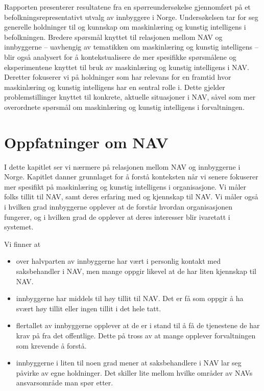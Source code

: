 \documentclass[
]{book}
\begin{document}
Rapporten presenterer resultatene fra en spørreundersøkelse gjennomført på et befolkningsrepresentativt utvalg av innbyggere i Norge.
Undersøkelsen tar for seg generelle holdninger til og kunnskap om maskinlæring og kunstig intelligens i befolkningen.
Bredere spørsmål knyttet til relasjonen mellom NAV og innbyggerne -- uavhengig av tematikken om maskinlæring og kunstig intelligens -- blir også analysert for å kontekstualisere de mer spesifikke spørsmålene og eksperimentene knyttet til bruk av maskinlæring og kunstig intelligens i NAV.
Deretter fokuserer vi på holdninger som har relevans for en framtid hvor maskinlæring og kunstig intelligens har en sentral rolle i.
Dette gjelder problemstillinger knyttet til konkrete, aktuelle situasjoner i NAV, såvel som mer overordnete spørsmål om maskinlæring og kunstig intelligens i forvaltningen.

\hypertarget{oppfatninger-om-nav}{%
\chapter{Oppfatninger om NAV}\label{oppfatninger-om-nav}}

I dette kapitlet ser vi nærmere på relasjonen mellom NAV og innbyggerne i Norge.
Kapitlet danner grunnlaget for å forstå konteksten når vi senere fokuserer mer spesifikt på maskinlæring og kunstig intelligens i organisasjone.
Vi måler folks tillit til NAV, samt deres erfaring med og kjennskap til NAV.
Vi måler også i hvilken grad innbyggerne opplever at de forstår hvordan organisasjonen fungerer, og i hvilken grad de opplever at deres interesser blir ivaretatt i systemet.

Vi finner at

\begin{itemize}
\item
  over halvparten av innbyggerne har vært i personlig kontakt med saksbehandler i NAV, men mange oppgir likevel at de har liten kjennskap til NAV.
\item
  innbyggerne har middels til høy tillit til NAV. Det er få som oppgir å ha svært høy tillit eller ingen tillit i det hele tatt.
\item
  flertallet av innbyggerne opplever at de er i stand til å få de tjenestene de har krav på fra det offentlige. Dette på tross av at mange opplever forvaltningen som krevende å forstå.
\item
  innbyggerne i liten til noen grad mener at saksbehandlere i NAV lar seg påvirke av egne holdninger. Det skiller lite mellom hvilke områder av NAVs ansvarsområde man spør etter.
\end{itemize}
\end{document}
